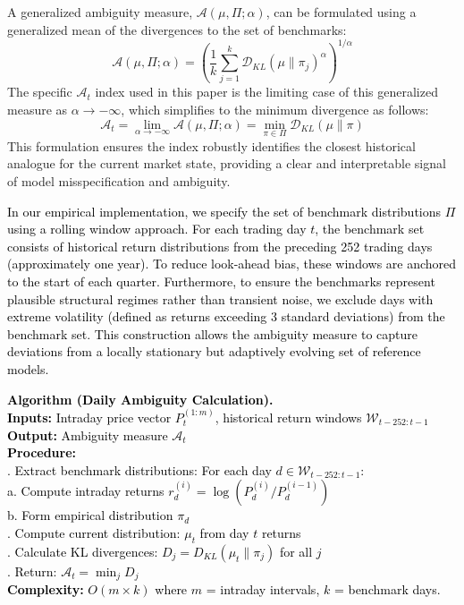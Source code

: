 \documentclass[preprint,12pt,authoryear]{elsarticle}
\begin{document}
A generalized ambiguity measure, $\mathcal{A}(\mu, \Pi; \alpha)$, can be formulated using a generalized mean of the divergences to the set of benchmarks:
\begin{equation}
    \mathcal{A}(\mu, \Pi; \alpha) = \left( \frac{1}{k} \sum_{j=1}^{k} \mathcal{D}_{KL}(\mu \| \pi_j)^{\alpha} \right)^{1/\alpha}
\end{equation}
The specific $\mathcal{A}_t$ index used in this paper is the limiting case of this generalized measure as $\alpha \to -\infty$, which simplifies to the minimum divergence as follows:
\begin{equation}
    \mathcal{A}_t = \lim_{\alpha \to -\infty} \mathcal{A}(\mu, \Pi; \alpha) = \min_{\pi \in \Pi} \mathcal{D}_{KL}(\mu \| \pi)
\end{equation}
This formulation ensures the index robustly identifies the closest historical analogue for the current market state, providing a clear and interpretable signal of model misspecification and ambiguity.

\textcolor{black}{In our empirical implementation, we specify the set of benchmark distributions $\Pi$ using a rolling window approach. For each trading day $t$, the benchmark set consists of historical return distributions from the preceding 252 trading days (approximately one year). To reduce look-ahead bias, these windows are anchored to the start of each quarter. Furthermore, to ensure the benchmarks represent plausible structural regimes rather than transient noise, we exclude days with extreme volatility (defined as returns exceeding 3 standard deviations) from the benchmark set. This construction allows the ambiguity measure to capture deviations from a locally stationary but adaptively evolving set of reference models.}

\vspace{\baselineskip}
\noindent
\textcolor{black}{
\textbf{Algorithm (Daily Ambiguity Calculation).}\\
\textbf{Inputs:} Intraday price vector $P_{t}^{(1:m)}$, historical return windows $\mathcal{W}_{t-252:t-1}$\\
\textbf{Output:} Ambiguity measure $\mathcal{A}_t$\\
\textbf{Procedure:}\\
. Extract benchmark distributions: For each day $d \in \mathcal{W}_{t-252:t-1}$:\\
\indent\indent a. Compute intraday returns $r^{(i)}_d = \log(P^{(i)}_d/P^{(i-1)}_d)$\\
\indent\indent b. Form empirical distribution $\pi_d$\\
. Compute current distribution: $\mu_t$ from day $t$ returns\\
. Calculate KL divergences: $D_j = D_{KL}(\mu_t \| \pi_j)$ for all $j$\\
. Return: $\mathcal{A}_t = \min_j D_j$\\
\textbf{Complexity:} $O(m \times k)$ where $m$ = intraday intervals, $k$ = benchmark days.
}
\end{document}

